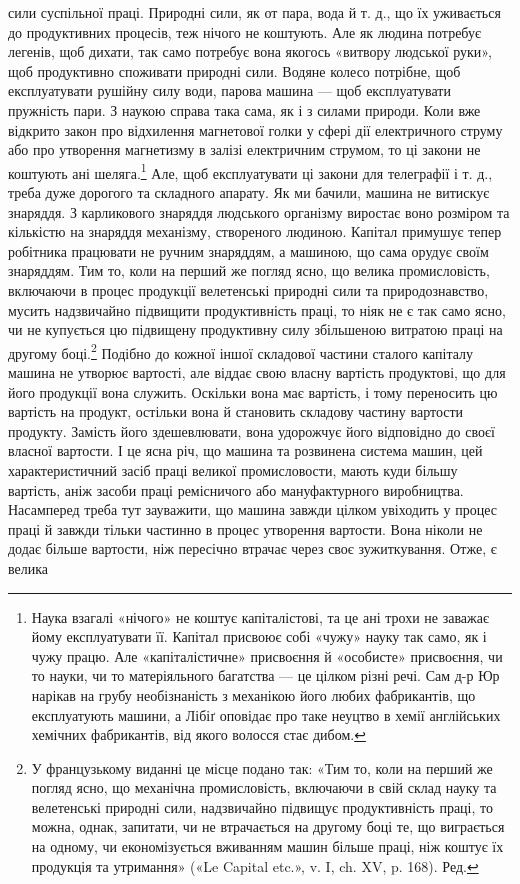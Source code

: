\parcont{}  %
сили суспільної праці. Природні сили, як от пара, вода й т. д.,
що їх уживається до продуктивних процесів, теж нічого не
коштують. Але як людина потребує легенів, щоб дихати, так само
потребує вона якогось «витвору людської руки», щоб продуктивно
споживати природні сили. Водяне колесо потрібне, щоб
експлуатувати рушійну силу води, парова машина — щоб експлуатувати
пружність пари. З наукою справа така сама, як і з силами
природи. Коли вже відкрито закон про відхилення магнетової
голки у сфері дії електричного струму або про утворення магнетизму
в залізі електричним струмом, то ці закони не коштують
ані шеляга.\footnote{
Наука взагалі «нічого» не коштує капіталістові, та це ані трохи
не заважає йому експлуатувати її. Капітал присвоює собі «чужу» науку
так само, як і чужу працю. Але «капіталістичне» присвоєння й «особисте»
присвоєння, чи то науки, чи то матеріяльного багатства — це цілком різні
речі. Сам д-р Юр нарікав на грубу необізнаність з механікою його любих
фабрикантів, що експлуатують машини, а Лібіґ оповідає про таке неуцтво
в хемії англійських хемічних фабрикантів, від якого волосся стає дибом.
} Але, щоб експлуатувати ці закони для телеграфії
і т. д., треба дуже дорогого та складного апарату. Як ми бачили,
машина не витискує знаряддя. З карликового знаряддя людського
організму виростає воно розміром та кількістю на знаряддя механізму,
створеного людиною. Капітал примушує тепер робітника
працювати не ручним знаряддям, а машиною, що сама орудує
своїм знаряддям. Тим то, коли на перший же погляд ясно, що
велика промисловість, включаючи в процес продукції велетенські
природні сили та природознавство, мусить надзвичайно
підвищити продуктивність праці, то ніяк не є так само ясно,
чи не купується цю підвищену продуктивну силу збільшеною
витратою праці на другому боці.\footnote*{
У французькому виданні це місце подано так: «Тим то, коли на
перший же погляд ясно, що механічна промисловість, включаючи в свій
склад науку та велетенські природні сили, надзвичайно підвищує продуктивність
праці, то можна, однак, запитати, чи не втрачається на другому
боці те, що виграється на одному, чи економізується вживанням
машин більше праці, ніж коштує їх продукція та утримання» («Le Capital
etc.», v. I, ch. XV, p. 168). Ред.
} Подібно до кожної іншої складової
частини сталого капіталу машина не утворює вартості,
але віддає свою власну вартість продуктові, що для його продукції
вона служить. Оскільки вона має вартість, і тому переносить
цю вартість на продукт, остільки вона й становить складову
частину вартости продукту. Замість його здешевлювати, вона
удорожчує його відповідно до своєї власної вартости. І це ясна
річ, що машина та розвинена система машин, цей характеристичний
засіб праці великої промисловости, мають куди більшу вартість,
аніж засоби праці ремісничого або мануфактурного виробництва.
Насамперед треба тут зауважити, що машина завжди цілком
увіходить у процес праці й завжди тільки частинно в процес
утворення вартости. Вона ніколи не додає більше вартости,
ніж пересічно втрачає через своє зужиткування. Отже, є велика
\parbreak{}  %
